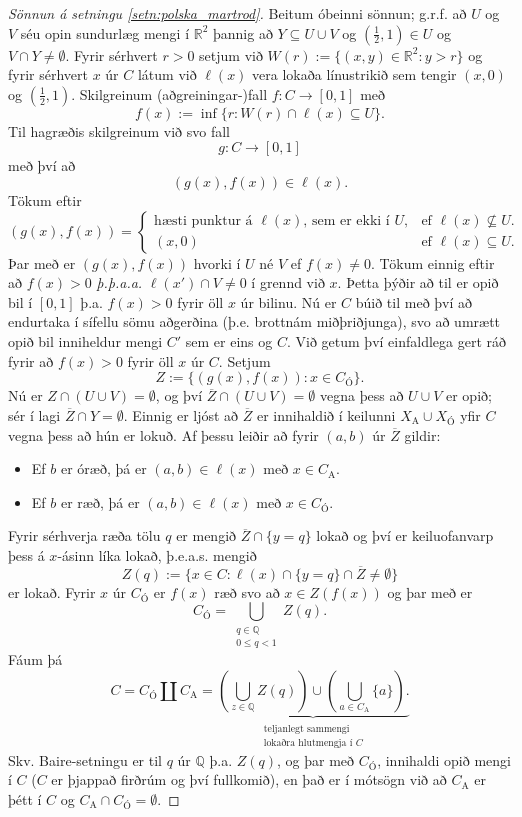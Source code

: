 \documentclass[a4paper,icelandic]{book}
\theoremstyle{definition}
\theoremstyle{plain}
\theoremstyle{remark}
\newcommand{\R}{\mathbb{R}} %
\newcommand{\Q}{\mathbb{Q}} %
\begin{document}
\begin{proof}
  [Sönnun á setningu \ref{setn:polska_martrod}] Beitum óbeinni sönnun; g.r.f. að
  $U$ og $V$ séu opin sundurlæg mengi í $\R^2$ þannig að $Y\subseteq U\cup V$ og
  $(\frac 12, 1)\in U$ og $V\cap Y\neq \emptyset$. Fyrir sérhvert $r > 0$ setjum
  við $W(r):= \{(x,y)\in\R^2 : y>r\}$ og fyrir sérhvert $x$ úr $C$ látum við
  $\ell(x)$ vera lokaða línustrikið sem tengir $(x,0)$ og $(\frac 12,
  1)$. Skilgreinum (aðgreiningar-)fall $f:C\to \left[0,1\right]$ með \[ f(x) :=
  \inf\{r : W(r)\cap\ell(x)\subseteq U\}.
  \]
  Til hagræðis skilgreinum við svo fall \[
  g:C\to\left[0,1\right]
  \]
  með því að \[
  (g(x),f(x))\in\ell(x).
  \]
  Tökum eftir \[
  (g(x),f(x)) =\begin{cases}
    \text{hæsti punktur á $\ell(x)$, sem er ekki í $U$}, & \text{ef
      $\ell(x)\nsubseteq U$}.\\
    (x,0) & \text{ef $\ell(x)\subseteq U$}.
  \end{cases}
  \]
  Þar með er $(g(x),f(x))$ hvorki í $U$ né $V$ ef $f(x)\neq 0$. Tökum einnig
  eftir að $f(x) > 0$ \emph{þ.þ.a.a.} $\ell(x')\cap V\neq 0$ í grennd við
  $x$. Þetta þýðir að til er opið bil í $\left[0,1\right]$ þ.a. $f(x)>0$ fyrir
  öll $x$ úr bilinu. Nú er $C$ búið til með því að endurtaka í sífellu sömu
  aðgerðina (þ.e. brottnám miðþriðjunga), svo að umrætt opið bil inniheldur
  mengi $C'$ sem er eins og $C$. Við getum því einfaldlega gert ráð fyrir að
  $f(x)>0$ fyrir öll $x$ úr $C$. Setjum \[
  Z := \{ (g(x),f(x)) : x\in C_\text{Ó}\}.
  \]
  Nú er $Z\cap (U\cup V) = \emptyset$, og því $\overline Z \cap (U\cup
  V)=\emptyset$ vegna þess að $U\cup V$ er opið; sér í lagi $\overline Z\cap Y =
  \emptyset$. Einnig er ljóst að $\overline Z$ er innihaldið í keilunni
  $X_\text{A} \cup X_\text{Ó}$ yfir $C$ vegna þess að hún er lokuð. Af þessu
  leiðir að fyrir $(a,b)$ úr $\overline Z$ gildir:
  \begin{itemize}
  \item Ef $b$ er óræð, þá er $(a,b)\in\ell(x)$ með $x\in C_\text{A}$.
  \item Ef $b$ er ræð, þá er $(a,b)\in\ell(x)$ með $x\in C_\text{Ó}$.
  \end{itemize}
  Fyrir sérhverja ræða tölu $q$ er mengið  $\overline Z\cap \{y=q\}$ lokað og
  því er keiluofanvarp þess á $x$-ásinn líka lokað, þ.e.a.s. mengið
  \[
  Z(q):=\{x\in C : \ell(x) \cap \{ y = q\}\cap \overline Z \neq\emptyset\}
  \]
  er lokað. Fyrir $x$ úr $C_\text{Ó}$ er $f(x)$ ræð svo að $x\in Z(f(x))$ og þar
  með er \[
  C_\text{Ó} = \bigcup_{\substack{q\in\Q\\0\leq q<1}}Z(q).
  \]
  Fáum þá \[
  C = C_\text{Ó} \coprod C_\text{A}
  =\underbrace{
   \left(\bigcup_{z\in\Q} Z(q)\right) \cup\left( \bigcup_{a\in C_\text{A}}\{a\}\right).
  }_{\substack{\text{teljanlegt sammengi}\\\text{lokaðra hlutmengja í $C$}}}
  \]
  Skv. Baire-setningu er til $q$ úr $\Q$ þ.a. $Z(q)$, og þar með $C_\text{Ó}$,
  innihaldi opið mengi í $C$ ($C$ er þjappað firðrúm og því fullkomið), en það
  er í mótsögn við að $C_\text{A}$ er þétt í $C$ og $C_\text{A}\cap C_\text{Ó}
  =\emptyset$.


\end{proof}
\end{document}
